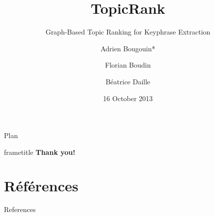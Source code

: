 \documentclass[14pt, xcolor={usenames, dvipsnames}]{beamer}
\title{TopicRank}
\subtitle{Graph-Based Topic Ranking for Keyphrase Extraction}
\author{Adrien Bougouin* \and Florian Boudin \and Béatrice Daille}
\institute{\normalsize{Université de Nantes, LINA, France}}
\date{16 October 2013}
\begin{document}
  \renewcommand*{\theenumii}{\alph{enumii}}
  \renewcommand*{\theenumiii}{\roman{enumiii}}

  \begin{frame}
    \titlepage
  \end{frame}
  \setcounter{framenumber}{0}

  
  
  
  \begin{frame}{Plan}
    \tableofcontents[section]
  \end{frame}
  
  
  
  \begin{frame}
    \begin{beamercolorbox}[center,shadow=true,rounded=true]{frametitle} 
      \Huge{\textbf{Thank you!}}
    \end{beamercolorbox} 
  \end{frame}
  
  \section*{Références}
    \begin{frame}[allowframebreaks]{References}
      \def\newblock{\hskip .11em plus .33em minus .07em}
      
      
    \end{frame}
\end{document}
